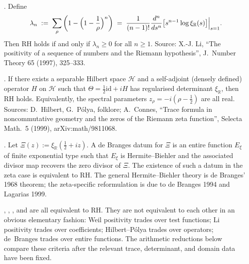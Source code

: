 \begin{theorem}[Li positivity]
\label{v4-arith:w5-direct:thm:li-positivity}
\ClaimStatusProvedElsewhere. Define
\begin{equation}
\label{v4-arith:w5-direct:eq:li-coef}
\lambda_{n}\;:=\;\sum_{\rho}\left(1-\Bigl(1-\frac{1}{\rho}\Bigr)^{n}\right)
\;=\;\frac{1}{(n-1)!}\frac{d^{n}}{ds^{n}}
\bigl[s^{n-1}\log\xi_{\mathbb{R}}(s)\bigr]\Big|_{s=1}.
\end{equation}
Then RH holds if and only if \(\lambda_{n}\geq 0\) for all \(n\geq 1\).
Source: X.-J. Li, ``The positivity of a sequence of numbers and the
Riemann hypothesis'', J.~Number Theory 65 (1997), 325--333.
\end{theorem}

\begin{theorem}
\label{v4-arith:w5-direct:thm:HP-form}
\ClaimStatusProvedElsewhere. If there exists a separable Hilbert space
\(\mathcal{H}\) and a self-adjoint (densely defined) operator \(H\) on
\(\mathcal{H}\) such that
\(\Theta=\tfrac12\mathrm{id}+iH\) has regularised determinant
\(\xi_{\mathbb R}\), then RH holds. Equivalently, the spectral
parameters \(z_{\rho}=-i(\rho-\tfrac12)\) are all real. Sources: D.~Hilbert,
G.~P\'olya, folklore; A.~Connes, ``Trace formula in noncommutative
geometry and the zeros of the Riemann zeta function'', Selecta Math.~5
(1999), arXiv:math/9811068.
\end{theorem}

\begin{theorem}
\label{v4-arith:w5-direct:thm:dB-form}
\ClaimStatusProvedElsewhere. Let
\(\Xi(z):=\xi_{\mathbb R}(\tfrac12+iz)\).  A de Branges datum for
\(\Xi\) is an entire function \(E_{\xi}\) of finite exponential type
such that \(E_{\xi}\) is Hermite--Biehler and the associated divisor
map recovers the zero divisor of \(\Xi\).  The existence of such a
datum in the zeta case is equivalent to RH.  The general
Hermite--Biehler theory is de Branges' 1968 theorem; the zeta-specific
reformulation is due to de Branges 1994 and Lagarias 1999.
\end{theorem}

\begin{remark}
\label{v4-arith:w5-direct:rem:four-equivalents}
,
,
, and
are all equivalent to RH. They are not equivalent to each other in an
obvious elementary fashion: Weil positivity trades over test
functions; Li positivity trades over coefficients; Hilbert--P\'olya
trades over operators; de~Branges trades over entire functions. The
arithmetic reductions below compare these criteria after the relevant
trace, determinant, and domain data have been fixed.
\end{remark}

